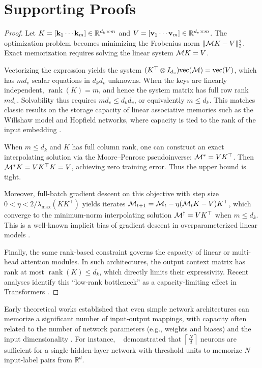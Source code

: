 


\section{Supporting Proofs}
\Capacity*
\begin{proof}
Let $K = [\mathbf{k}_1 \cdots \mathbf{k}_m] \in \mathbb{R}^{d_k \times m}$ and $V = [\mathbf{v}_1 \cdots \mathbf{v}_m] \in \mathbb{R}^{d_v \times m}$. The optimization problem becomes minimizing the Frobenius norm $\|\mathcal{M} K - V\|_2^2$. Exact memorization requires solving the linear system $\mathcal{M} K = V$.

Vectorizing the expression yields the system $(K^\top \otimes I_{d_v}) \mathrm{vec}(\mathcal{M}) = \mathrm{vec}(V)$, which has $m d_v$ scalar equations in $d_k d_v$ unknowns. When the keys are linearly independent, $\operatorname{rank}(K) = m$, and hence the system matrix has full row rank $m d_v$. Solvability thus requires $m d_v \le d_k d_v$, or equivalently $m \le d_k$. This matches classic results on the storage capacity of linear associative memories such as the Willshaw model and Hopfield networks, where capacity is tied to the rank of the input embedding \citep{willshaw1969non, hopfield1982neural}.

When $m \le d_k$ and $K$ has full column rank, one can construct an exact interpolating solution via the Moore–Penrose pseudoinverse: $\mathcal{M}^* = V K^\top$. Then $\mathcal{M}^* K = V K^{\top} K = V$, achieving zero training error. Thus the upper bound is tight.

Moreover, full-batch gradient descent on this objective with step size $0 < \eta < 2 / \lambda_{\max}(K K^\top)$ yields iterates $\mathcal{M}_{t+1} = \mathcal{M}_t - \eta (\mathcal{M}_t K - V) K^\top$, which converge to the minimum-norm interpolating solution $\mathcal{M}^\dagger = V K^\top$ when $m \le d_k$. This is a well-known implicit bias of gradient descent in overparameterized linear models \citep{satpathi2021dynamics}.

Finally, the same rank-based constraint governs the capacity of linear or multi-head attention modules. In such architectures, the output context matrix has rank at most $\operatorname{rank}(K) \le d_k$, which directly limits their expressivity. Recent analyses identify this “low-rank bottleneck” as a capacity-limiting effect in Transformers \citep{bhojanapalli2020low}.
\end{proof}

\DeepMemory*
Early theoretical works established that even simple network architectures can memorize a significant number of input-output mappings, with capacity often related to the number of network parameters (e.g., weights and biases) and the input dimensionality \citet{cover1965geometricalproperties, baum1988capabilitiesmultilayer,  huang2003learningcapability}. For instance, ~\citet{baum1988capabilitiesmultilayer} demonstrated that $\left\lceil \frac{N}{d} \right\rceil$ neurons are sufficient for a single-hidden-layer network with threshold units to memorize $N$ input-label pairs from $\mathbb{R}^d$.

